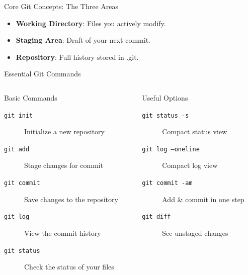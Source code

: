 \documentclass[aspectratio=169]{beamer}
\begin{document}
\begin{frame}{Core Git Concepts: The Three Areas}
  \centering
  \begin{itemize}
      \item \textbf{Working Directory}: Files you actively modify.
      \item \textbf{Staging Area}: Draft of your next commit.
      \item \textbf{Repository}: Full history stored in .git.
  \end{itemize}
\end{frame}

\begin{frame}{Essential Git Commands}
  \begin{columns}
    \begin{column}{0.48\textwidth}
      \begin{block}{Basic Commands}
        \begin{description}
          \item[\texttt{git init}] Initialize a new repository
          \item[\texttt{git add}] Stage changes for commit
          \item[\texttt{git commit}] Save changes to the repository
          \item[\texttt{git log}] View the commit history
          \item[\texttt{git status}] Check the status of your files
        \end{description}
      \end{block}
    \end{column}
    \begin{column}{0.48\textwidth}
      \begin{block}{Useful Options}
        \begin{description}
          \item[\texttt{git status -s}] Compact status view
          \item[\texttt{git log --oneline}] Compact log view
          \item[\texttt{git commit -am}] Add \& commit in one step
          \item[\texttt{git diff}] See unstaged changes
        \end{description}
      \end{block}
    \end{column}
  \end{columns}
\end{frame}
\end{document}
